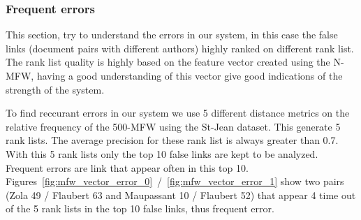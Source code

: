 \subsubsection{Frequent errors}

This section, try to understand the errors in our system, in this case the false links (document pairs with different authors) highly ranked on different rank list.
The rank list quality is highly based on the feature vector created using the N-MFW, having a good understanding of this vector give good indications of the strength of the system.

To find reccurant errors in our system we use 5 different distance metrics on the relative frequency of the 500-MFW using the St-Jean dataset.
This generate 5 rank lists.
The average precision for these rank list is always greater than 0.7.
With this 5 rank lists only the top 10 false links are kept to be analyzed.
Frequent errors are link that appear often in this top 10.
Figures~\ref{fig:mfw_vector_error_0}~/~\ref{fig:mfw_vector_error_1} show two pairs (Zola 49 / Flaubert 63 and Maupassant 10 / Flaubert 52) that appear 4 time out of the 5 rank lists in the top 10 false links, thus frequent error.

